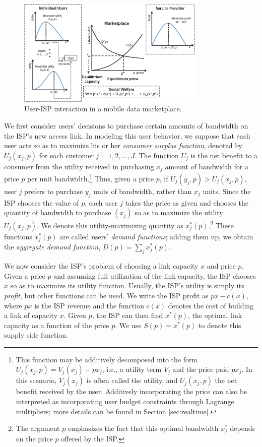\begin{figure}
\centering
\includegraphics[width = 0.8\textwidth]{Figures/Supply_Demand.eps}
\caption{User-ISP interaction in a mobile data marketplace.}
\label{fig:supply-demand}
\end{figure}

We first consider users' decisions to purchase certain amounts of bandwidth on the ISP's new access link. In modeling this user behavior, we suppose that each user acts so as to maximize his or her \emph{consumer surplus function}, denoted by $U_j(x_j,p)$ for each customer $j = 1,2,\ldots, J$. The function $U_j$ is the net benefit to a consumer from the utility received in purchasing $x_j$ amount of bandwidth for a price $p$ per unit bandwidth.\footnote{This function may be additively decomposed into the form $U_j(x_j,p) = V_j(x_j) - px_j$, i.e., a utility term $V_j$ and the price paid $px_j$. In this scenario, $V_j(x_j)$ is often called the utility, and $U_j(x_j,p)$ the net benefit received by the user. Additively incorporating the price can also be interpreted as incorporating user budget constraints through Lagrange multipliers; more details can be found in Section \ref{sec:realtime}.} Thus, given a price $p$, if $U_j(y_j, p) > U_j(x_j,p)$, user $j$ prefers to purchase $y_j$ units of bandwidth, rather than $x_j$ units. Since the ISP chooses the value of $p$, each user $j$ takes the price as given and chooses the quantity of bandwidth to purchase $\left(x_j\right)$ so as to maximize the utility $U_j(x_j, p)$. We denote this utility-maximizing quantity as $x_j^\ast(p)$.\footnote{The argument $p$ emphasizes the fact that this optimal bandwidth $x_j^\ast$ depends on the price $p$ offered by the ISP.} These functions $x_j^\ast(p)$ are called users' \emph{demand functions}; adding them up, we obtain the \emph{aggregate demand function}, $D(p) = \sum_j x_j^\ast(p)$.

We now consider the ISP's problem of choosing a link capacity $x$ and price $p$. Given a price $p$ and assuming full utilization of the link capacity, the ISP chooses $x$ so as to maximize its utility function. Usually, the ISP's utility is simply its \emph{profit}, but other functions can be used. We write the ISP profit as $px - c(x)$, where $px$ is the ISP revenue and the function $c(x)$ denotes the cost of building a link of capacity $x$. Given $p$, the ISP can then find $x^\ast(p)$, the optimal link capacity as a function of the price $p$. We use $S(p) = x^\ast(p)$ to denote this supply side function.

